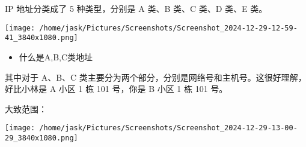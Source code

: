 \documentclass[11pt]{article}
\begin{document}
IP 地址分类成了 5 种类型，分别是 A 类、B 类、C 类、D 类、E 类。

\begin{center}
\texttt{[image: /home/jask/Pictures/Screenshots/Screenshot\_2024-12-29-12-59-41\_3840x1080.png]}
\end{center}

\begin{itemize}
\item 什么是A,B,C类地址
\end{itemize}
其中对于 A、B、C 类主要分为两个部分，分别是网络号和主机号。这很好理解，好比小林是 A 小区 1 栋 101 号，你是 B 小区 1 栋 101 号。

大致范围：

\begin{center}
\texttt{[image: /home/jask/Pictures/Screenshots/Screenshot\_2024-12-29-13-00-29\_3840x1080.png]}
\end{center}
\end{document}
